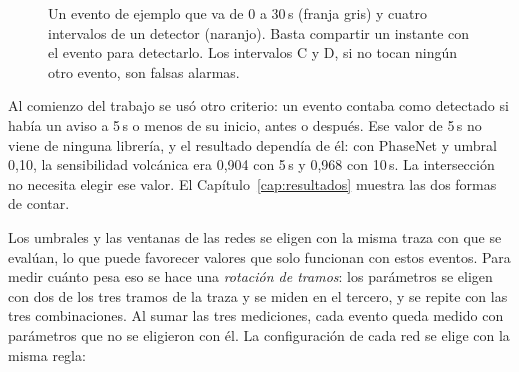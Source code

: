 \begin{figure}[!ht]
\centering
{}
\caption{Un evento de ejemplo que va de 0 a 30\,s (franja gris) y cuatro
intervalos de un detector (naranjo). Basta compartir un instante con el evento
para detectarlo. Los intervalos C y D, si no tocan ningún otro evento, son
falsas alarmas.}
\label{fig:interseccion}
\end{figure}

Al comienzo del trabajo se usó otro criterio: un evento contaba como detectado
si había un aviso a 5\,s o menos de su inicio, antes o después. Ese valor de
5\,s no viene de ninguna librería, y el resultado dependía de él: con
PhaseNet y umbral 0,10, la sensibilidad volcánica era 0,904 con 5\,s y 0,968
con 10\,s. La intersección no necesita elegir ese valor. El
Capítulo~\ref{cap:resultados} muestra las dos formas de contar.

Los umbrales y las ventanas de las redes se eligen con la misma traza con que
se evalúan, lo que puede favorecer valores que solo funcionan con estos
eventos. Para medir cuánto pesa eso se hace una \emph{rotación de tramos}: los
parámetros se eligen con dos de los tres tramos de la traza y se miden en el
tercero, y se repite con las tres combinaciones. Al sumar las tres mediciones,
cada evento queda medido con parámetros que no se eligieron con él. La
configuración de cada red se elige con la misma regla:

